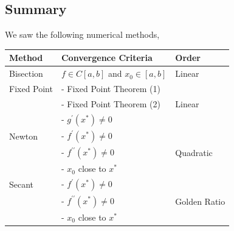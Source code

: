 \subsection{Summary}
We saw the following numerical methods,
\begin{table}[h]
\begin{tabularx}{\textwidth}{lll}
\toprule
\textbf{Method} & \textbf{Convergence Criteria} & \textbf{Order} \\
\midrule
Bisection & $f \in C[a, b]$ and $x_0 \in[a, b]$ & Linear \\
\midrule
Fixed Point
&- Fixed Point Theorem (1) &  \\
&- Fixed Point Theorem (2) & Linear \\
&- $g^{\prime}\left(x^*\right) \neq 0$ &  \\
\midrule
Newton
&- $f^{\prime}\left(x^*\right) \neq 0$ & \\
&- $f^{\prime\prime}\left(x^*\right) \neq 0$ & Quadratic \\
&- $x_0$ close to $x^*$ & \\
\midrule
Secant
&- $f^{\prime}\left(x^*\right) \neq 0$ & \\
&- $f^{\prime\prime}\left(x^*\right) \neq 0$ & Golden Ratio \\
&- $x_0$ close to $x^*$ & \\
\bottomrule
\end{tabularx}
\end{table}